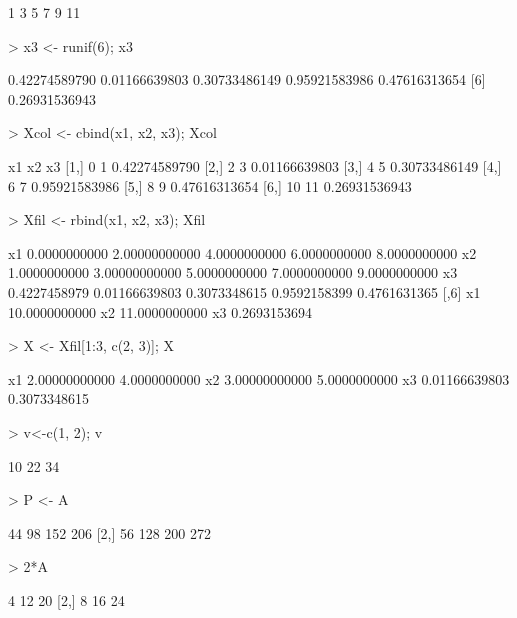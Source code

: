 \documentclass{article}
\begin{document}
\begin{Schunk}
\begin{Soutput}
[1]  1  3  5  7  9 11
\end{Soutput}
\begin{Sinput}
> x3 <- runif(6); x3
\end{Sinput}
\begin{Soutput}
[1] 0.42274589790 0.01166639803 0.30733486149 0.95921583986 0.47616313654
[6] 0.26931536943
\end{Soutput}
\begin{Sinput}
> Xcol <- cbind(x1, x2, x3); Xcol
\end{Sinput}
\begin{Soutput}
     x1 x2            x3
[1,]  0  1 0.42274589790
[2,]  2  3 0.01166639803
[3,]  4  5 0.30733486149
[4,]  6  7 0.95921583986
[5,]  8  9 0.47616313654
[6,] 10 11 0.26931536943
\end{Soutput}
\begin{Sinput}
> Xfil <- rbind(x1, x2, x3); Xfil
\end{Sinput}
\begin{Soutput}
           [,1]          [,2]         [,3]         [,4]         [,5]
x1 0.0000000000 2.00000000000 4.0000000000 6.0000000000 8.0000000000
x2 1.0000000000 3.00000000000 5.0000000000 7.0000000000 9.0000000000
x3 0.4227458979 0.01166639803 0.3073348615 0.9592158399 0.4761631365
            [,6]
x1 10.0000000000
x2 11.0000000000
x3  0.2693153694
\end{Soutput}
\begin{Sinput}
> X <- Xfil[1:3, c(2, 3)]; X
\end{Sinput}
\begin{Soutput}
            [,1]         [,2]
x1 2.00000000000 4.0000000000
x2 3.00000000000 5.0000000000
x3 0.01166639803 0.3073348615
\end{Soutput}
\begin{Sinput}
> v<-c(1, 2); v %*%A
\end{Sinput}
\begin{Soutput}
     [,1] [,2] [,3]
[1,]   10   22   34
\end{Soutput}
\begin{Sinput}
> P <- A %*% B; P
\end{Sinput}
\begin{Soutput}
     [,1] [,2] [,3] [,4]
[1,]   44   98  152  206
[2,]   56  128  200  272
\end{Soutput}
\begin{Sinput}
> 2*A
\end{Sinput}
\begin{Soutput}
     [,1] [,2] [,3]
[1,]    4   12   20
[2,]    8   16   24

\end{Soutput}
\end{Schunk}
\end{document}
